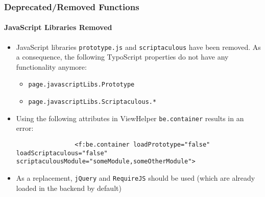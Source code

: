 \begin{frame}[fragile]
	\frametitle{Deprecated/Removed Functions}
	\framesubtitle{JavaScript Libraries Removed}

	\begin{itemize}

		\item JavaScript libraries \texttt{prototype.js} and \texttt{scriptaculous} have been removed.
			As a consequence, the following TypoScript properties do not have any functionality anymore:

			\begin{itemize}
				\item \texttt{page.javascriptLibs.Prototype}
				\item \texttt{page.javascriptLibs.Scriptaculous.*}
			\end{itemize}

		\item Using the following attributes in ViewHelper \texttt{be.container} results in an error:
			\begin{lstlisting}
				<f:be.container loadPrototype="false" loadScriptaculous="false" scriptaculousModule="someModule,someOtherModule">
			\end{lstlisting}

		\item As a replacement, \texttt{jQuery} and \texttt{RequireJS} should be used\newline
			(which are already loaded in the backend by default)

	\end{itemize}

\end{frame}


